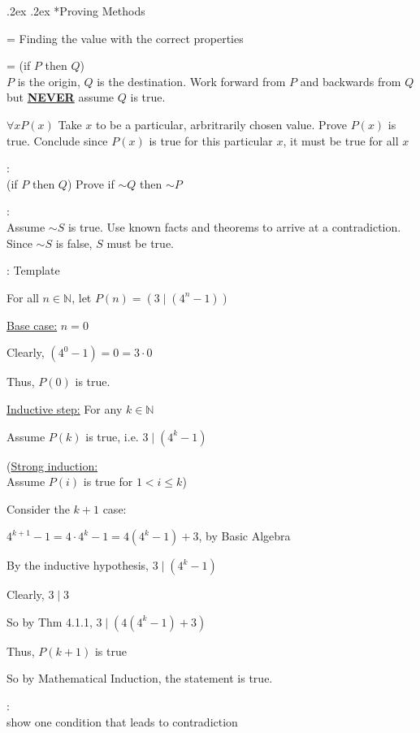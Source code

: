 \documentclass[10pt,landscape,a4paper]{article}
\makeatletter
\newenvironment{descitemize} %
{\begin{description}[leftmargin=*,before=\let\makelabel\descitemlabel]}
{\end{description}}
\newcommand{\descitemlabel}[1]{%
\textbullet\ \textbf{#1}%
}
\renewcommand{\subsection}{\@startsection{subsection}{1}{0mm}%
                                {.2ex}%
                                {.2ex}%
                                {\sffamily\bfseries}}
\makeatother
\begin{document}
\begin{multicols*}{4}
  \subsection*{Proving Methods}
  \begin{descitemize}
    \item [By construction] = Finding the value with the correct properties
    \item [If-then] = (if $P$ then $Q$) \\
    $P$ is the origin, $Q$ is the destination. Work forward from $P$ and backwards from $Q$ but \textbf{\underline{NEVER}} assume $Q$ is true.
    \item $\forall x P(x)$
    Take $x$ to be a particular, arbritrarily chosen value. Prove $P(x)$ is true. Conclude since $P(x)$ is true for this particular $x$, it must be true for all $x$
    \item [By contrapositive]: \\ (if $P$ then $Q$) Prove if $\sim Q$ then $\sim P$
    \item [By contradiction]: \\ Assume $\sim S$ is true. Use known facts and theorems to arrive at a contradiction. Since $\sim S$ is false, $S$ must be true.
    \item [By induction]: Template
    \begin{legal}
      \item For all $n \in \mathbb{N}$, let $P(n) = (3 \mid (4^n - 1))$
      \item \underline{Base case:} $n = 0$
      \begin{legal}
        \item Clearly, $(4^0 - 1) = 0 = 3 \cdot 0$
        \item Thus, $P(0)$ is true.
      \end{legal}
      \item \underline{Inductive step:} For any $k \in \mathbb{N}$
      \begin{legal}
        \item Assume $P(k)$ is true, i.e. $3 \mid (4^k - 1)$
        \item (\underline{Strong induction:}\\
        Assume $P(i)$ is true for $1 < i \leq k$)
        \item Consider the $k+1$ case:
        \item $4^{k+1} - 1 = 4 \cdot 4^k - 1 = 4(4^k - 1) + 3$, by Basic Algebra
        \item By the inductive hypothesis, $3 \mid (4^k - 1)$
        \item Clearly, $3 \mid 3$
        \item So by Thm 4.1.1, $3 \mid (4(4^k -1)+3)$
        \item Thus, $P(k+1)$ is true
      \end{legal}
      \item So by Mathematical Induction, the statement is true.
    \end{legal}
    \item [Disproving by counterexample]: \\ show one condition that leads to contradiction
  \end{descitemize}

\end{multicols*}
\end{document}

